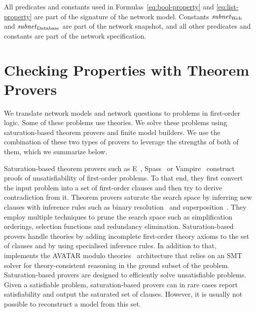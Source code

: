 All predicates and constants used in Formulas~\ref{eq:bool-property} and \ref{eq:list-property} are part of the signature of the network model. Constants $\mathit{subnet}_\text{Web}$ and $\mathit{subnet}_\text{Database}$ are part of the network snapshot, and all other predicates and constants are part of the network specification.

% 

\section{Checking Properties with Theorem Provers}
\label{sect:aws/fol-provers}

We translate network models and network questions to problems in first-order logic. Some of these problems use theories. We solve these problems using saturation-based theorem provers and finite model builders. We use the combination of these two types of provers to leverage the strengths of both of them, which we summarize below.

Saturation-based theorem provers such as E~\cite{E13}, Spass~\cite{Spass} or Vampire~\cite{Vampire13} construct proofs of unsatisfiability of first-order problems. To that end, they first convert the input problem into a set of first-order clauses and then try to derive contradiction from it. Theorem provers saturate the search space by inferring new clauses with inference rules such as binary resolution~\cite{Ganzinger01} and superposition~\cite{NieuwenhuisRubio:HandbookAR:paramodulation:2001}. They employ multiple techniques to prune the search space such as simplification orderings, selection functions and redundancy elimination. Saturation-based provers handle theories by adding incomplete first-order theory axioms to the set of clauses and by using specialised inference rules. In addition to that, \vampire implements the AVATAR modulo theories~\cite{DBLP:conf/gcai/RegerB0V16} architecture that relies on an SMT solver for theory-consistent reasoning in the ground subset of the problem. Saturation-based provers are designed to efficiently solve unsatisfiable problems. Given a satisfiable problem, saturation-based provers can in rare cases report satisfiability and output the saturated set of clauses. However, it is usually not possible to reconstruct a model from this set.

